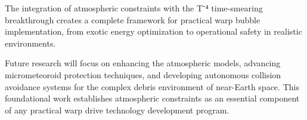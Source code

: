 \documentclass[12pt,a4paper]{article}
\begin{document}
The integration of atmospheric constraints with the T⁻⁴ time-smearing breakthrough creates a complete framework for practical warp bubble implementation, from exotic energy optimization to operational safety in realistic environments.

Future research will focus on enhancing the atmospheric models, advancing micrometeoroid protection techniques, and developing autonomous collision avoidance systems for the complex debris environment of near-Earth space. This foundational work establishes atmospheric constraints as an essential component of any practical warp drive technology development program.
\end{document}
